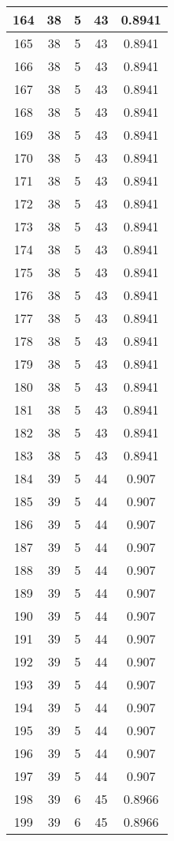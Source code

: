 \documentclass[letterpaper, 12pt]{article}
\begin{document}
\begin{longtable}{|c|c|c|c|c|}
\hline
164 & 38 & 5 & 43 & 0.8941 \\
\hline
165 & 38 & 5 & 43 & 0.8941 \\
\hline
166 & 38 & 5 & 43 & 0.8941 \\
\hline
167 & 38 & 5 & 43 & 0.8941 \\
\hline
168 & 38 & 5 & 43 & 0.8941 \\
\hline
169 & 38 & 5 & 43 & 0.8941 \\
\hline
170 & 38 & 5 & 43 & 0.8941 \\
\hline
171 & 38 & 5 & 43 & 0.8941 \\
\hline
172 & 38 & 5 & 43 & 0.8941 \\
\hline
173 & 38 & 5 & 43 & 0.8941 \\
\hline
174 & 38 & 5 & 43 & 0.8941 \\
\hline
175 & 38 & 5 & 43 & 0.8941 \\
\hline
176 & 38 & 5 & 43 & 0.8941 \\
\hline
177 & 38 & 5 & 43 & 0.8941 \\
\hline
178 & 38 & 5 & 43 & 0.8941 \\
\hline
179 & 38 & 5 & 43 & 0.8941 \\
\hline
180 & 38 & 5 & 43 & 0.8941 \\
\hline
181 & 38 & 5 & 43 & 0.8941 \\
\hline
182 & 38 & 5 & 43 & 0.8941 \\
\hline
183 & 38 & 5 & 43 & 0.8941 \\
\hline
184 & 39 & 5 & 44 & 0.907 \\
\hline
185 & 39 & 5 & 44 & 0.907 \\
\hline
186 & 39 & 5 & 44 & 0.907 \\
\hline
187 & 39 & 5 & 44 & 0.907 \\
\hline
188 & 39 & 5 & 44 & 0.907 \\
\hline
189 & 39 & 5 & 44 & 0.907 \\
\hline
190 & 39 & 5 & 44 & 0.907 \\
\hline
191 & 39 & 5 & 44 & 0.907 \\
\hline
192 & 39 & 5 & 44 & 0.907 \\
\hline
193 & 39 & 5 & 44 & 0.907 \\
\hline
194 & 39 & 5 & 44 & 0.907 \\
\hline
195 & 39 & 5 & 44 & 0.907 \\
\hline
196 & 39 & 5 & 44 & 0.907 \\
\hline
197 & 39 & 5 & 44 & 0.907 \\
\hline
198 & 39 & 6 & 45 & 0.8966 \\
\hline
199 & 39 & 6 & 45 & 0.8966 \\
\hline
\end{longtable}
\end{document}
